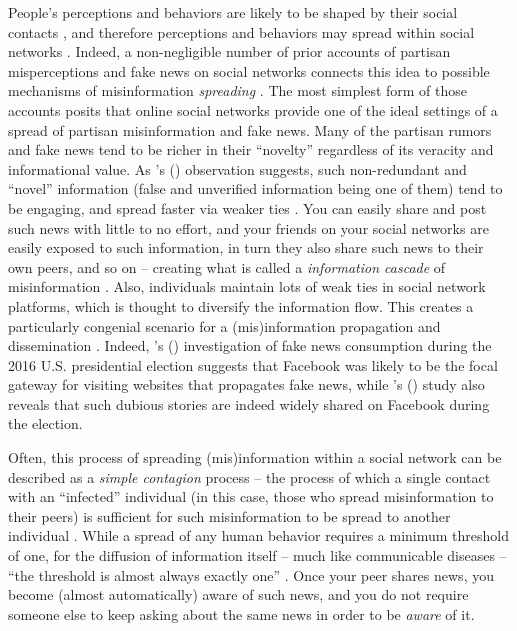 \documentclass[man, 12pt, a4paper, noextraspace]{apa6}
\begin{document}
  People's perceptions and behaviors are likely to be shaped by their social contacts \parencite{lazer2010coevolution, centola2007complex}, and therefore perceptions and behaviors may spread within social networks \parencite[e.g.,][]{bond_61million}. Indeed, a non-negligible number of prior accounts of partisan misperceptions and fake news on social networks connects this idea to possible mechanisms of misinformation \emph{spreading}  \parencite[e.g.,][]{del2016spreading, Bakshy_2012}. The most simplest form of those accounts posits that online social networks provide one of the ideal settings of a spread of partisan misinformation and fake news. Many of the partisan rumors and fake news tend to be richer in their \enquote{novelty} \parencite{wu2007novelty} regardless of its veracity and informational value. As \citeauthor{giglietto2016fakes}'s (\citeyear{giglietto2016fakes}) observation suggests, such non-redundant and \enquote{novel} information (false and unverified information being one of them) tend to be engaging, and spread faster via weaker ties \parencite{granovetter1977strength}. You can easily share and post such news with little to no effort, and your friends on your social networks are easily exposed to such information, in turn they also share such news to their own peers, and so on -- creating what is called a \emph{information cascade} of misinformation \parencite{del2016spreading}. Also, individuals maintain lots of weak ties in social network platforms, which is thought to diversify the information flow. This creates a particularly congenial scenario for a (mis)information propagation and dissemination \parencite{Bakshy_2012, granovetter1977strength}. Indeed, \citeauthor{guess2018selective}'s (\citeyear{guess2018selective}) investigation of fake news consumption during the 2016 U.S. presidential election suggests that Facebook was likely to be the focal gateway for visiting websites that propagates fake news, while \citeauthor{allcott2017social}'s (\citeyear{allcott2017social}) study also reveals that such dubious stories are indeed widely shared on Facebook during the election. 
    
    Often, this process of spreading (mis)information within a social network can be described as a \emph{simple contagion} process -- the process of which a single contact with an \enquote{infected} individual (in this case, those who spread misinformation to their peers) is sufficient for such misinformation to be spread to another individual \parencite{Monsted_plos2017, Centola2010Sience, siegel2009social}. While a spread of any human behavior requires a minimum threshold of one, for the diffusion of information itself -- much like communicable diseases -- \enquote{the threshold is almost always exactly one}  \parencites[][p. 706]{centola2007complex}[also see][]{Centola2010Sience}. Once your peer shares news, you become (almost automatically) aware of such news, and you do not require someone else to keep asking about the same news in order to be \emph{aware} of it.  
    
\end{document}
